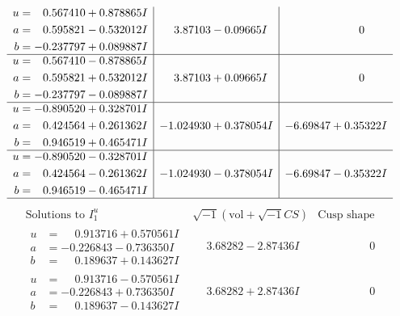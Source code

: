\documentclass[1p]{elsarticle_modified}
\theoremstyle{definition}
\newcommand{\I}{\sqrt{-1}}
\begin{document}
$$\begin{array}{c|c|c}
\begin{aligned}
u &= \phantom{-}0.567410 + 0.878865 I \\
a &= \phantom{-}0.595821 - 0.532012 I \\
b &= -0.237797 + 0.089887 I\end{aligned}
 & \phantom{-}3.87103 - 0.09665 I & \phantom{-0.000000 } 0 \\ \hline\begin{aligned}
u &= \phantom{-}0.567410 - 0.878865 I \\
a &= \phantom{-}0.595821 + 0.532012 I \\
b &= -0.237797 - 0.089887 I\end{aligned}
 & \phantom{-}3.87103 + 0.09665 I & \phantom{-0.000000 } 0 \\ \hline\begin{aligned}
u &= -0.890520 + 0.328701 I \\
a &= \phantom{-}0.424564 + 0.261362 I \\
b &= \phantom{-}0.946519 + 0.465471 I\end{aligned}
 & -1.024930 + 0.378054 I & -6.69847 + 0.35322 I \\ \hline\begin{aligned}
u &= -0.890520 - 0.328701 I \\
a &= \phantom{-}0.424564 - 0.261362 I \\
b &= \phantom{-}0.946519 - 0.465471 I\end{aligned}
 & -1.024930 - 0.378054 I & -6.69847 - 0.35322 I\\
 \hline 
 \end{array}$$\newpage$$\begin{array}{c|c|c}  
\text{Solutions to }I^u_{1}& \I (\text{vol} + \sqrt{-1}CS) & \text{Cusp shape}\\
 \hline 
\begin{aligned}
u &= \phantom{-}0.913716 + 0.570561 I \\
a &= -0.226843 - 0.736350 I \\
b &= \phantom{-}0.189637 + 0.143627 I\end{aligned}
 & \phantom{-}3.68282 - 2.87436 I & \phantom{-0.000000 } 0 \\ \hline\begin{aligned}
u &= \phantom{-}0.913716 - 0.570561 I \\
a &= -0.226843 + 0.736350 I \\
b &= \phantom{-}0.189637 - 0.143627 I\end{aligned}
 & \phantom{-}3.68282 + 2.87436 I & \phantom{-0.000000 } 0 \\ \hline\begin{aligned}

\end{aligned}
\end{array}$$
\end{document}
